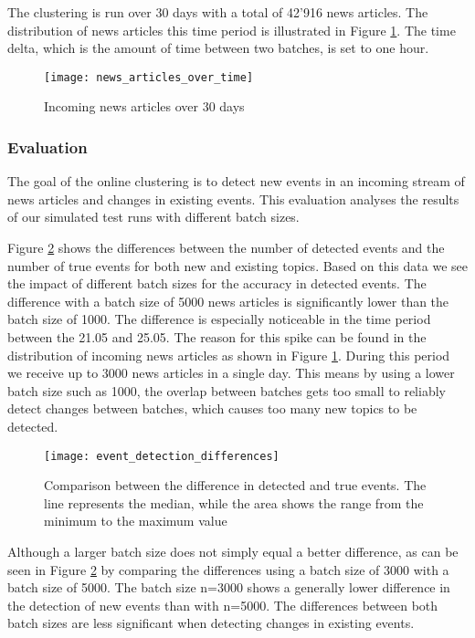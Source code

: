 The clustering is run over 30 days with a total of 42'916 news articles. The distribution of news articles this time period is illustrated in Figure \ref{fig:news_articles_over_time}. The time delta, which is the amount of time between two batches, is set to one hour. 


\begin{figure}[h]
    \centering
    \texttt{[image: news\_articles\_over\_time]}
    \caption{Incoming news articles over 30 days}
    \label{fig:news_articles_over_time}
\end{figure}

\subsubsection{Evaluation}

The goal of the online clustering is to detect new events in an incoming stream of news articles and changes in existing events. This evaluation analyses the results of our simulated test runs with different batch sizes.

Figure \ref{fig:event_detection_differences} shows the differences between the number of detected events and the number of true events for both new and existing topics. Based on this data we see the impact of different batch sizes for the accuracy in detected events. The difference with a batch size of 5000 news articles is significantly lower than the batch size of 1000. The difference is especially noticeable in the time period between the 21.05 and 25.05. The reason for this spike can be found in the distribution of incoming news articles as shown in Figure \ref{fig:news_articles_over_time}. During this period we receive up to 3000 news articles in a single day. This means by using a lower batch size such as 1000, the overlap between batches gets too small to reliably detect changes between batches, which causes too many new topics to be detected. 

\begin{figure}[h]
    \centering
    \texttt{[image: event\_detection\_differences]}
    \caption{Comparison between the difference in detected and true events. The line represents the median, while the area shows the range from the minimum to the maximum value}
    \label{fig:event_detection_differences}
\end{figure}

Although a larger batch size does not simply equal a better difference, as can be seen in Figure \ref{fig:event_detection_differences} by comparing the differences using a batch size of 3000 with a batch size of 5000. The batch size n=3000 shows a generally lower difference in the detection of new events than with n=5000. The differences between both batch sizes are less significant when detecting changes in existing events.

